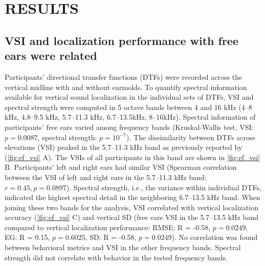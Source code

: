 \section{RESULTS}\label{sec3}%

\subsection{VSI and localization performance with free ears were related}

Participants' directional transfer functions (DTFs) were recorded across the vertical midline with and without earmolds. To quantify spectral information available for vertical sound localization in the individual sets of DTFs, VSI \citep{trapeau_fast_2016} and spectral strength \citep{andeol_sound_2013} were computed in 5 octave bands between 4 and 16 kHz (4–8 kHz, 4.8–9.5 kHz, 5.7–11.3 kHz, 6.7–13.5kHz, 8–16kHz). Spectral information of participants’ free ears varied among frequency bands (Kruskal-Wallis test, VSI: $p = 0.0087$, spectral strength: $p = 10^{-7}$). The dissimilarity between DTFs across elevations (VSI) peaked in the 5.7–11.3 kHz band as previously reported by \citet{trapeau_fast_2016} (\cref{fig:ef_vsi} A). The VSIs of all participants in this band are shown in \cref{fig:ef_vsi} B. Participants' left and right ears had similar VSI (Spearman correlation between the VSI of left and right ears in the 5.7–11.3 kHz band: $r = 0.45, p = 0.0897$). Spectral strength, i.e., the variance within individual DTFs, indicated the highest spectral detail in the neighboring 6.7–13.5 kHz band. When joining these two bands for the analysis, VSI correlated with vertical localization accuracy (\cref{fig:ef_vsi} C) and vertical SD (free ears VSI in the 5.7–13.5 kHz band compared to vertical localization performance: RMSE: R = -0.58, $p = 0.0249$, EG: R = 0.15, $p = 0.6025$, SD: R = -0.58, $p = 0.0249$). No correlation was found between behavioral metrics and VSI in the other frequency bands. Spectral strength did not correlate with behavior in the tested frequency bands.

